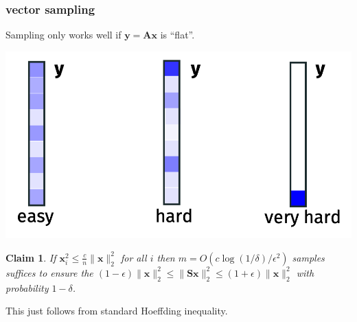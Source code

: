 \documentclass[compress]{beamer}
\newcommand{\bv}[1]{\mathbf{#1}}
\newtheorem{claim}[theorem]{Claim}
\begin{document}
\begin{frame}[t]
	\frametitle{vector sampling}
	Sampling only works well if $\bv{y} = \bv{A}\bv{x}$ is ``flat''. 
	\vspace{-.5em}
	\begin{center}
		\includegraphics[width=.6\textwidth]{uniform_hard.png}
	\end{center}
	\vspace{-.5em}
	
\begin{claim}
		If $\bv{x}_i^2 \leq \frac{c}{n} \|\bv{x}\|_2^2$ for all $i$ then $m  = O(c\log(1/\delta)/\epsilon^2)$ samples suffices to ensure the $(1-\epsilon)\|\bv{x}\|_2^2 \leq \|\bv{S}\bv{x}\|_2^2 \leq (1+\epsilon)\|\bv{x}\|_2^2$ with probability $1-\delta$.
\end{claim}
This just follows from standard Hoeffding inequality. 
\end{frame}
\end{document}
